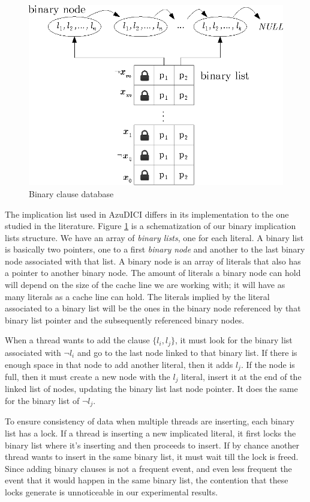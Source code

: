 \documentclass[12pt]{diicc}
\begin{document}
\begin{figure}[tp]
  \centering
  \includegraphics[scale=1.0]{implication_list}
  \caption{Binary clause database}
  \label{fig:shared bins}
\end{figure}

The implication list used in AzuDICI differs in its implementation to the 
one studied in the literature. Figure \ref{fig:shared bins} is a schematization of our 
binary implication lists structure. We have an array of \textit{binary 
lists}, one for each literal. A binary list is basically two pointers, 
one to a first \textit{binary node} and another to the last binary node 
associated with that list. A 
binary node is an array of literals that also has a pointer to another 
binary node. The amount of literals a binary node can hold will depend 
on the size of the cache line we are working with; it will have as many 
literals as a cache line can hold. The literals implied by the literal 
associated to a binary list will be the ones in the binary node 
referenced by that binary list pointer and the subsequently referenced 
binary nodes. 

When a thread wants to add the clause $\{l_i,l_j\}$, it must look for 
the binary list associated with $\neg l_i$ and go to the last node linked 
to that binary list. If there is enough space in that node to add 
another literal, then it adds $l_j$. If the node is full, then it must 
create a new node with the $l_j$ literal, insert it at the end of the 
linked list of nodes, 
updating the binary list last node pointer. It does the same for the 
binary list of $\neg l_j$.

To ensure consistency of 
data when multiple threads are inserting, each binary list has a lock. 
If a thread is inserting a new implicated literal, it first locks the 
binary list where it's inserting and then proceeds to insert. If by 
chance another thread wants to insert in the same binary list, it must 
wait till the lock is freed. Since adding binary clauses is not a 
frequent event, and even less frequent the event that it would happen 
in the same binary list, the contention that these locks generate is 
unnoticeable in our experimental results.
\end{document}
